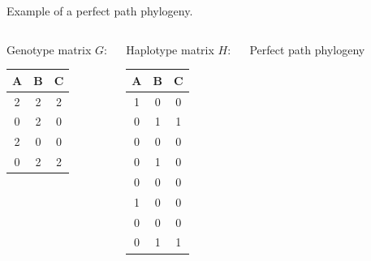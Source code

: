\documentclass[aspectratio=1610]{beamer}
\begin{document}
\begin{frame}{Example of a perfect path phylogeny.}
  \begin{columns}[t]
    \begin{exampleblock}{Genotype matrix}
      $G\colon$
      \begin{tabular}{ccc}
        A & B & C \\\hline
        2 & 2 & 2 \\
        0 & 2 & 0 \\
        2 & 0 & 0 \\
        0 & 2 & 2 
      \end{tabular}
    \end{exampleblock}

    \begin{exampleblock}{Haplotype matrix}
      $H\colon$
      \begin{tabular}{ccc}
        A & B & C \\\hline
        1 & 0 & 0 \\
        0 & 1 & 1 \\
        0 & 0 & 0 \\
        0 & 1 & 0 \\
        0 & 0 & 0 \\
        1 & 0 & 0 \\
        0 & 0 & 0 \\
        0 & 1 & 1 
      \end{tabular}
    \end{exampleblock}

    \begin{exampleblock}{Perfect path phylogeny}
      \begin{center}
      \end{center}
    \end{exampleblock}
  \end{columns}
\end{frame}
\end{document}
